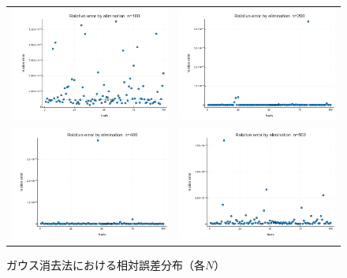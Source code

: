 \documentclass[a4paper,11pt]{ltjsarticle}
\begin{document}
    \begin{figure}[H]
    \centering
    \begin{tabular}{cc}
    \includegraphics[width=72mm]{graphs/exp1_n100_relerr_solution.png} &
    \includegraphics[width=72mm]{graphs/exp1_n200_relerr_solution.png} \\
    \includegraphics[width=72mm]{graphs/exp1_n400_relerr_solution.png} &
    \includegraphics[width=72mm]{graphs/exp1_n800_relerr_solution.png} \\
    \end{tabular}
    \caption{ガウス消去法における相対誤差分布（各$N$）}
    \label{fig:exp1_relerrs}
    \end{figure}
\end{document}
